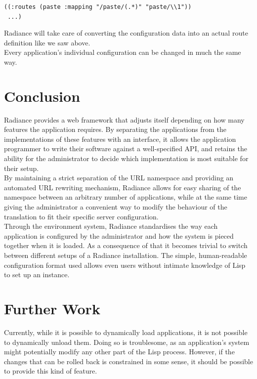 \documentclass{sig-alternate}
\begin{document}
\begin{verbatim}
((:routes (paste :mapping "/paste/(.*)" "paste/\\1"))
 ...)
\end{verbatim}

Radiance will take care of converting the configuration data into an actual route definition like we saw above. \\

Every application's individual configuration can be changed in much the same way.

\section{Conclusion}
Radiance provides a web framework that adjusts itself depending on how many features the application requires. By separating the applications from the implementations of these features with an interface, it allows the application programmer to write their software against a well-specified API, and retains the ability for the administrator to decide which implementation is most suitable for their setup. \\

By maintaining a strict separation of the URL namespace and providing an automated URL rewriting mechanism, Radiance allows for easy sharing of the namespace between an arbitrary number of applications, while at the same time giving the administrator a convenient way to modify the behaviour of the translation to fit their specific server configuration. \\

Through the environment system, Radiance standardises the way each application is configured by the administrator and how the system is pieced together when it is loaded. As a consequence of that it becomes trivial to switch between different setups of a Radiance installation. The simple, human-readable configuration format used allows even users without intimate knowledge of Lisp to set up an instance.

\section{Further Work}
Currently, while it is possible to dynamically load applications, it is not possible to dynamically unload them. Doing so is troublesome, as an application's system might potentially modify any other part of the Lisp process. However, if the changes that can be rolled back is constrained in some sense, it should be possible to provide this kind of feature. \\
\end{document}
